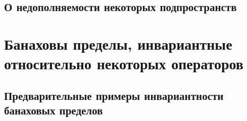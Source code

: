 \documentclass[12pt,a4paper,openbib]{report}
\theoremstyle{definition}
\begin{document}


	\section{О недополняемости некоторых подпространств}
	
	

\chapter{Банаховы пределы, инвариантные относительно некоторых операторов}

	

	\section{Предварительные примеры инвариантности банаховых пределов}
	
	
	
	

\end{document}
